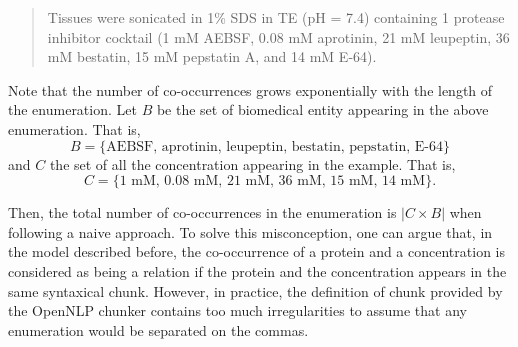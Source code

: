 \begin{quote}
Tissues were sonicated in 1\% SDS in TE (pH = 7.4) containing 1 protease inhibitor cocktail (1 mM AEBSF, 0.08 mM aprotinin, 21 mM leupeptin, 36 mM bestatin, 15 mM pepstatin A, and 14 mM E-64).
\end{quote}

Note that the number of co-occurrences grows exponentially with the length of the enumeration. Let $B$ be the set of biomedical entity appearing in the above enumeration.
That is,
$$
B = \{\text{AEBSF, aprotinin, leupeptin, bestatin, pepstatin, E-64}\}
$$
and $C$ the set of all the concentration appearing in the example. That is,
$$
C = \{\text{1 mM, 0.08 mM, 21 mM, 36 mM, 15 mM, 14 mM}\}.
$$

Then, the total number of co-occurrences in the enumeration is $|C\times B|$ when following a naive approach. To solve this misconception, one can argue that, in the model described before, the co-occurrence of a protein and a
concentration is considered as being a relation if the protein and the concentration appears in the same syntaxical chunk. However, in practice, the definition of
chunk provided by the OpenNLP chunker \cite{chunker} contains too much irregularities to assume that any enumeration would be separated on the commas. 

